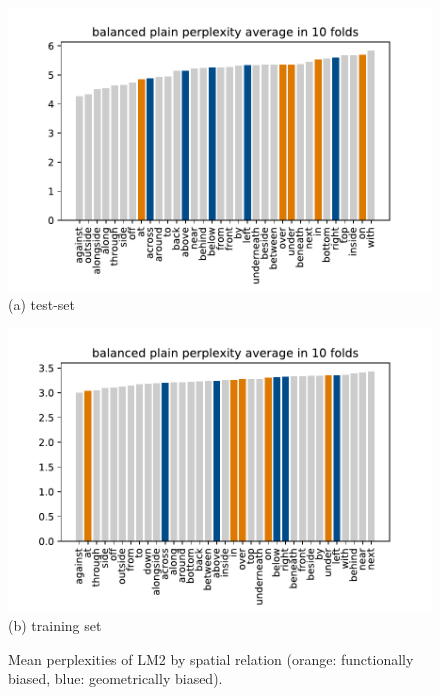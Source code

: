 \begin{figure}[ht]
  \begin{center}
    \begin{minipage}{0.5\linewidth}
	    \centering
	    \hspace*{-1.2em}\includegraphics[width=1.12\linewidth]{studies/splu2018/figures/b_pp_cv-avg.pdf}\\
		(a) test-set 
    \end{minipage}%
    \begin{minipage}{0.5\linewidth}
	    \centering
	    \hspace*{-1.em}\includegraphics[width=1.12\linewidth]{studies/splu2018/figures/b_train_pp_cv-avg.pdf}\\
	    (b) training set
     \end{minipage}%
  \caption{Mean perplexities of LM2 by spatial relation (orange:
    functionally biased, blue: geometrically biased).}\label{splu2018:fig:fig-plain-balanced}
\end{center}
\end{figure}

